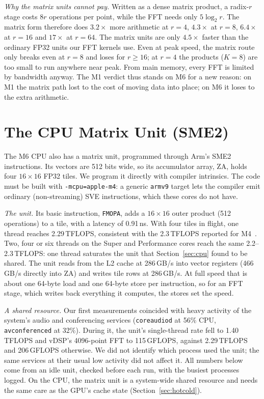 \documentclass[conference]{IEEEtran}
\newcommand{\GF}{\,GFLOPS}
\begin{document}
\textit{Why the matrix units cannot pay.} Written as a dense matrix product, a radix-$r$ stage costs
$8r$ operations per point, while the FFT needs only $5\log_2r$. The matrix form therefore does
$3.2\times$ more arithmetic at $r=4$, $4.3\times$ at $r=8$, $6.4\times$ at $r=16$ and $17\times$ at
$r=64$. The matrix units are only $4.5\times$ faster than the ordinary FP32 units our FFT kernels use.
Even at peak speed, the matrix route only breaks even at $r=8$ and loses for $r\ge16$; at $r=4$ the
products ($K=8$) are too small to run anywhere near peak. From main memory, every FFT is limited by
bandwidth anyway. The M1 verdict thus stands on M6 for a new reason: on M1 the matrix path lost to the
cost of moving data into place; on M6 it loses to the extra arithmetic.

\section{The CPU Matrix Unit (SME2)}\label{sec:sme}

The M6 CPU also has a matrix unit, programmed through Arm's SME2 instructions. Its vectors are 512 bits
wide, so its accumulator array, ZA, holds four $16\times16$ FP32 tiles. We program it directly with
compiler intrinsics. The code must be built with \texttt{-mcpu=apple-m4}: a generic \texttt{armv9}
target lets the compiler emit ordinary (non-streaming) SVE instructions, which these cores do not have.

\textit{The unit.} Its basic instruction, \texttt{FMOPA}, adds a $16\times16$ outer product (512
operations) to a tile, with a latency of 0.91\,ns. With four tiles in flight, one thread reaches
2.29\,TFLOPS, consistent with the 2.3\,TFLOPS reported for M4~\cite{remke2024hellosme}. Two, four or six
threads on the Super and Performance cores reach the same 2.2--2.3\,TFLOPS: one thread saturates the
unit that Section~\ref{sec:cpu} found to be shared. The unit reads from the L2 cache at 286\,GB/s into
vector registers (466\,GB/s directly into ZA) and writes tile rows at 286\,GB/s. At full speed that is
about one 64-byte load and one 64-byte store per instruction, so for an FFT stage, which writes back
everything it computes, the stores set the speed.

\textit{A shared resource.} Our first measurements coincided with heavy activity of the system's audio
and conferencing services (\texttt{coreaudiod} at 56\% CPU, \texttt{avconferenced} at 32\%). During it,
the unit's single-thread rate fell to 1.40\,TFLOPS and vDSP's 4096-point FFT to 115\GF{}, against
2.29\,TFLOPS and 206\GF{} otherwise. We did not identify which process used the unit; the same services
at their usual low activity did not affect it. All numbers below come from an idle unit, checked before
each run, with the busiest processes logged. On the CPU, the matrix unit is a system-wide shared resource
and needs the same care as the GPU's cache state (Section~\ref{sec:hotcold}).
\end{document}

